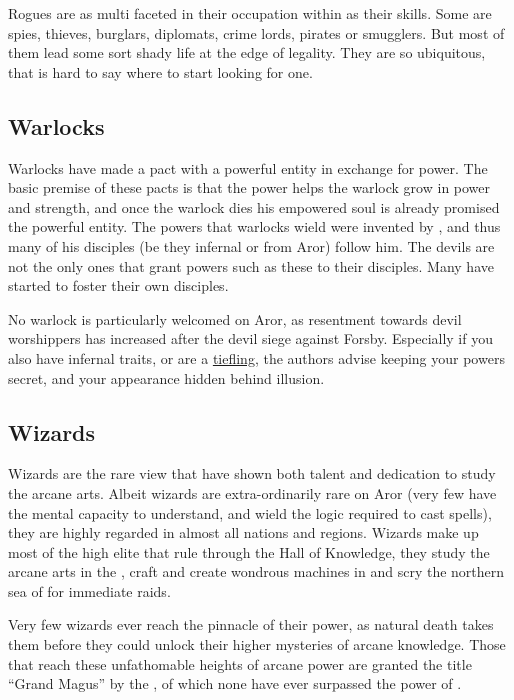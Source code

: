 Rogues are as multi faceted in their occupation within as their skills. Some
are spies, thieves, burglars, diplomats, crime lords, pirates or smugglers.
But most of them lead some sort shady life at the edge of legality. They are
so ubiquitous, that is hard to say where to start looking for one.


\subsection{Warlocks}
\label{sec:Warlocks}

Warlocks have made a pact with a powerful entity in exchange for power. The
basic premise of these pacts is that the power helps the warlock grow in
power and strength, and once the warlock dies his empowered soul is already
promised the powerful entity. The powers that warlocks wield were invented
by , and thus many of his disciples (be they infernal
or from Aror) follow him. The devils are not the only ones that grant powers
such as these to their disciples. Many  have started
to foster their own disciples.

No warlock is particularly welcomed on Aror, as resentment towards devil
worshippers has increased after the devil siege against Forsby. Especially if
you also have infernal traits, or are a \hyperref[sec:Tieflings]{tiefling},
the authors advise keeping your powers secret, and your appearance hidden
behind illusion.

\subsection{Wizards}
\label{sec:Wizards}

Wizards are the rare view that have shown both talent and dedication to study
the arcane arts. Albeit wizards are extra-ordinarily rare on Aror (very few
have the mental capacity to understand, and wield the logic required to cast
spells), they are highly regarded in almost all nations and regions. Wizards
make up most of the high elite that rule  through
the Hall of Knowledge, they study the arcane arts in the , craft and create wondrous machines in  and
scry the northern sea of  for immediate raids.

Very few wizards ever reach the pinnacle of their power, as natural death
takes them before they could unlock their higher mysteries of arcane
knowledge. Those that reach these unfathomable heights of arcane power are
granted the title ``Grand Magus'' by the ,
of which none have ever surpassed the power of .

